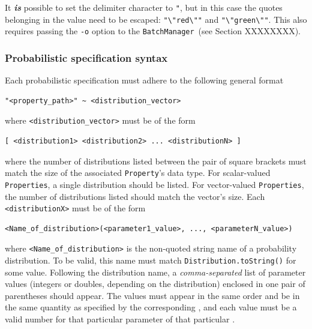 \documentclass{article}
\newcommand{\BM}{{\tt BatchManager}}
\begin{document}
\begin{sideblock}
It \textbf{\textit{is}} possible to set the delimiter character to {\tt "}, but in this case the quotes belonging in the value need to be escaped: {\tt "\textbackslash"red\textbackslash""} and {\tt "\textbackslash"green\textbackslash""}. This also requires passing the {\tt -o} option to the \BM\ (see Section XXXXXXXX).
\end{sideblock}

\subsubsection{Probabilistic specification syntax}

Each probabilistic specification must adhere to the following general format

\begin{lstlisting}[]
   "<property_path>" ~ <distribution_vector>
\end{lstlisting}

where {\tt <distribution\_vector>} must be of the form

\begin{lstlisting}[]
   [ <distribution1> <distribution2> ... <distributionN> ]
\end{lstlisting}

where the number of distributions listed between the pair of square brackets must match the size of the associated {\tt Property}'s data type. For scalar-valued {\tt Properties}, a single distribution should be listed. For vector-valued {\tt Properties}, the number of distributions listed should match the vector's size. Each {\tt <distributionX>} must be of the form

\begin{lstlisting}[]
  <Name_of_distribution>(<parameter1_value>, ..., <parameterN_value>)
\end{lstlisting}

where {\tt <Name\_of\_distribution>} is the non-quoted string name of a probability distribution. To be valid, this name must match {\tt Distribution.toString()} for some  value. Following the distribution name, a \textit{comma-separated} list of parameter values (integers or doubles, depending on the distribution) enclosed in one pair of parentheses should appear. The values must appear in the same order and be in the same quantity as specified by the corresponding , and each value must be a valid number for that particular parameter of that particular . 
\end{document}

